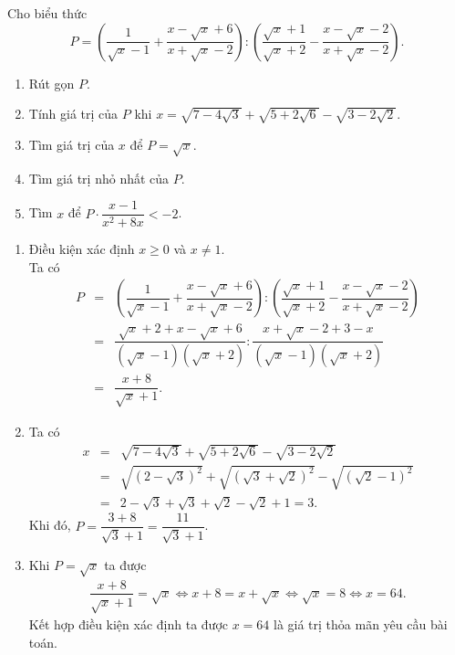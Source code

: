 \begin{bt}%
	Cho biểu thức
	$$P=\left(\dfrac{1}{\sqrt{x}-1}+\dfrac{x-\sqrt{x}+6}{x+\sqrt{x}-2}\right) : \left(\dfrac{\sqrt{x}+1}{\sqrt{x}+2}-\dfrac{x-\sqrt{x}-2}{x+\sqrt{x}-2}\right).$$
	\begin{enumerate}
		\item Rút gọn $P$.
		\item Tính giá trị của $P$ khi $x=\sqrt{7-4\sqrt{3}} + \sqrt{5+2\sqrt{6}} - \sqrt{3-2\sqrt{2}}$.
		\item Tìm giá trị của $x$ để $P=\sqrt{x}$.
		\item Tìm giá trị nhỏ nhất của $P$.
		\item Tìm $x$ để $P \cdot \dfrac{x-1}{x^2+8x}<-2$.
	\end{enumerate}
	\loigiai
	{
		\begin{enumerate}
			\item Điều kiện xác định $x \geq 0$ và $x \neq 1$.\\
			Ta có
			\allowdisplaybreaks
			\begin{eqnarray*}
				P &=& \left(\dfrac{1}{\sqrt{x}-1}+\dfrac{x-\sqrt{x}+6}{x+\sqrt{x}-2}\right) : \left(\dfrac{\sqrt{x}+1}{\sqrt{x}+2}-\dfrac{x-\sqrt{x}-2}{x+\sqrt{x}-2}\right)\\
				&=& \dfrac{\sqrt{x}+2+x-\sqrt{x}+6}{\left(\sqrt{x}-1\right)\left(\sqrt{x}+2\right)} : \dfrac{x+\sqrt{x}-2+3-x}{\left(\sqrt{x}-1\right)\left(\sqrt{x}+2\right)}\\
				&=& \dfrac{x+8}{\sqrt{x}+1}.
			\end{eqnarray*}
			\item Ta có
			\allowdisplaybreaks
			\begin{eqnarray*}
				x &=& \sqrt{7-4\sqrt{3}} + \sqrt{5+2\sqrt{6}} - \sqrt{3-2\sqrt{2}}\\
				&=& \sqrt{\left(2-\sqrt{3}\right)^2} + \sqrt{\left(\sqrt{3}+\sqrt{2}\right)^2} - \sqrt{\left(\sqrt{2}-1\right)^2}\\
				&=& 2-\sqrt{3}+\sqrt{3}+\sqrt{2}-\sqrt{2}+1 =3.
			\end{eqnarray*}
			Khi đó, $P = \dfrac{3+8}{\sqrt{3}+1} = \dfrac{11}{\sqrt{3}+1}$.
			\item Khi $P=\sqrt{x}$ ta được
			\allowdisplaybreaks
			\begin{eqnarray*}
				\dfrac{x+8}{\sqrt{x}+1} = \sqrt{x} \Leftrightarrow x+8 = x+\sqrt{x} \Leftrightarrow \sqrt{x}=8 \Leftrightarrow x=64.
			\end{eqnarray*}
			Kết hợp điều kiện xác định ta được $x=64$ là giá trị thỏa mãn yêu cầu bài toán.

\end{enumerate}}
\end{bt}
